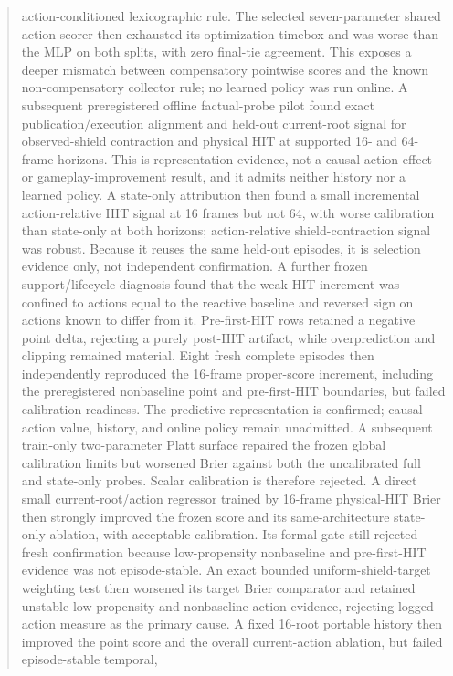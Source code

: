 \documentclass[11pt]{article}
\begin{document}
\begin{abstract}
action-conditioned lexicographic rule.  The selected seven-parameter shared
action scorer then exhausted its optimization timebox and was worse than the
MLP on both splits, with zero final-tie agreement.  This exposes a deeper
mismatch between compensatory pointwise scores and the known non-compensatory
collector rule; no learned policy was run online.
A subsequent preregistered offline factual-probe pilot found exact
publication/execution alignment and held-out current-root signal for
observed-shield contraction and physical HIT at supported 16- and 64-frame
horizons.  This is representation evidence, not a causal action-effect or
gameplay-improvement result, and it admits neither history nor a learned
policy.
A state-only attribution then found a small incremental action-relative HIT
signal at 16 frames but not 64, with worse calibration than state-only at both
horizons; action-relative shield-contraction signal was robust.  Because it
reuses the same held-out episodes, it is selection evidence only, not
independent confirmation.  A further frozen support/lifecycle diagnosis found
that the weak HIT increment was confined to actions equal to the reactive
baseline and reversed sign on actions known to differ from it.  Pre-first-HIT
rows retained a negative point delta, rejecting a purely post-HIT artifact,
while overprediction and clipping remained material.  Eight fresh complete
episodes then independently reproduced the 16-frame proper-score increment,
including the preregistered nonbaseline point and pre-first-HIT boundaries, but
failed calibration readiness.  The predictive representation is confirmed;
causal action value, history, and online policy remain unadmitted.
A subsequent train-only two-parameter Platt surface repaired the frozen global
calibration limits but worsened Brier against both the uncalibrated full and
state-only probes.  Scalar calibration is therefore rejected.  A direct small
current-root/action regressor trained by 16-frame physical-HIT Brier then
strongly improved the frozen score and its same-architecture state-only
ablation, with acceptable calibration.  Its formal gate still rejected fresh
confirmation because low-propensity nonbaseline and pre-first-HIT evidence was
not episode-stable.  An exact bounded uniform-shield-target weighting test then
worsened its target Brier comparator and retained unstable low-propensity and
nonbaseline action evidence, rejecting logged action measure as the primary
cause.  A fixed 16-root portable history then improved the point score and the
overall current-action ablation, but failed episode-stable temporal,

\end{abstract}
\end{document}
